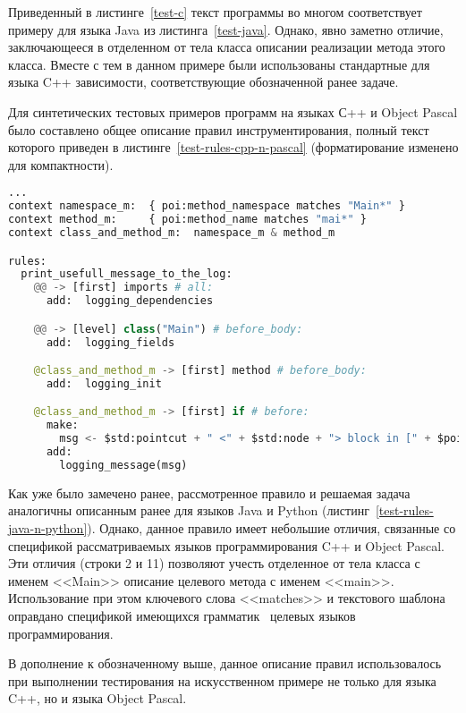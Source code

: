 Приведенный в листинге~\ref{test-c} текст программы во многом соответствует примеру для языка Java из листинга~\ref{test-java}.
Однако, явно заметно отличие, заключающееся в отделенном от тела класса описании реализации метода этого класса.
Вместе с тем в данном примере были использованы стандартные для языка C++ зависимости, соответствующие обозначенной ранее задаче.

Для синтетических тестовых примеров программ на языках С++ и Object Pascal было составлено общее описание правил инструментирования, полный текст которого приведен в листинге~\ref{test-rules-cpp-n-pascal} (форматирование изменено для компактности).

\begin{lstlisting}[frame=single, language=Python, label={test-rules-cpp-n-pascal}, caption={Описание правил инструментирования.}]
...
context namespace_m:  { poi:method_namespace matches "Main*" }
context method_m:     { poi:method_name matches "mai*" }
context class_and_method_m:  namespace_m & method_m

rules:
  print_usefull_message_to_the_log:
    @@ -> [first] imports # all:
      add:  logging_dependencies

    @@ -> [level] class("Main") # before_body:
      add:  logging_fields

    @class_and_method_m -> [first] method # before_body:
      add:  logging_init

    @class_and_method_m -> [first] if # before:
      make:
        msg <- $std:pointcut + " <" + $std:node + "> block in [" + $poi:method_name_full + "] method";
      add:
        logging_message(msg)
\end{lstlisting}

Как уже было замечено ранее, рассмотренное правило и решаемая задача аналогичны описанным ранее для языков Java и Python (листинг~\ref{test-rules-java-n-python}).
Однако, данное правило имеет небольшие отличия, связанные со спецификой рассматриваемых языков программирования C++ и Object Pascal.
Эти отличия (строки 2 и 11) позволяют учесть отделенное от тела класса с именем <<Main>> описание целевого метода с именем <<main>>.
Использование при этом ключевого слова <<matches>> и текстового шаблона оправдано спецификой имеющихся грамматик~\cite{txl-resources} целевых языков программирования.

В дополнение к обозначенному выше, данное описание правил использовалось при выполнении тестирования на искусственном примере не только для языка C++, но и языка Object Pascal.

